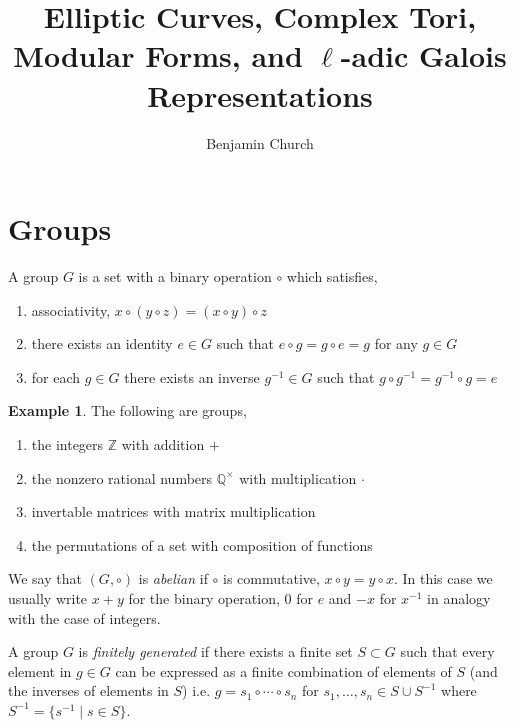 \documentclass{article}
\title{Elliptic Curves, Complex Tori, Modular Forms, and $\ell$-adic Galois Representations}
\author{Benjamin Church}
\newcommand{\Z}{\mathbb{Z}}
\newcommand{\Q}{\mathbb{Q}}
\theoremstyle{definition}
\newtheorem{example}[theorem]{Example}
\newenvironment{definition}[1][Definition:]{\begin{trivlist}
\item[\hskip \labelsep {\bfseries #1}]}{\end{trivlist}}
\begin{document}
\maketitle

\tableofcontents

\newpage

\section{Groups}

\begin{definition}
A group $G$ is a set with a binary operation $\circ$ which satisfies,
\begin{enumerate}
\item associativity, $x \circ (y \circ z) = (x \circ y) \circ z$
\item there exists an identity $e \in G$ such that $e \circ g = g \circ e = g$ for any $g \in G$
\item for each $g \in G$ there exists an inverse $g^{-1} \in G$ such that $g \circ g^{-1} = g^{-1} \circ g = e$
\end{enumerate} 
\end{definition}

\begin{example}
The following are groups,
\begin{enumerate}
\item the integers $\Z$ with addition $+$
\item the nonzero rational numbers $\Q^\times$ with multiplication $\cdot$
\item invertable matrices with matrix multiplication
\item the permutations of a set with composition of functions
\end{enumerate}
\end{example}

\begin{definition}
We say that $(G, \circ)$ is \textit{abelian} if $\circ$ is commutative, $x \circ y = y \circ x$. In this case we usually write $x + y$ for the binary operation, $0$ for $e$ and $-x$ for $x^{-1}$ in analogy with the case of integers. 
\end{definition}

\begin{definition}
A group $G$ is \textit{finitely generated} if there exists a finite set $S \subset G$ such that every element in $g \in G$ can be expressed as a finite combination of elements of $S$ (and the inverses of elements in $S$) i.e. $g = s_1 \circ \cdots \circ s_n$ for $s_1, \dots, s_n \in S \cup S^{-1}$ where $S^{-1} = \{ s^{-1} \mid s \in S \}$.
\end{definition}
\end{document}

